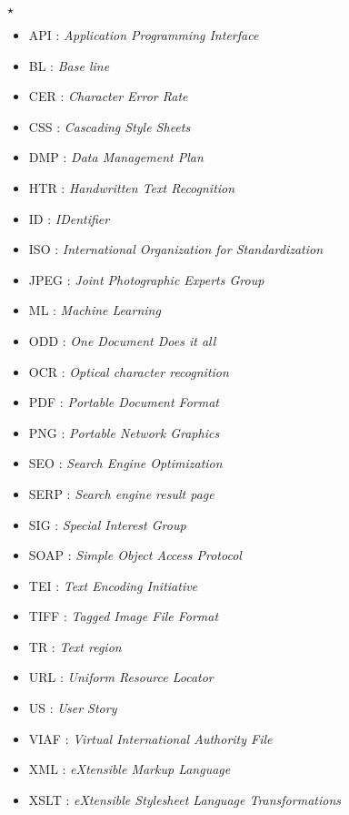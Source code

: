\begin{center}
$\star$
\end{center} 


\begin{itemize}
\item API : \emph{Application Programming Interface}
\item BL : \emph{Base line}
\item CER : \emph{Character Error Rate}
\item CSS : \emph{Cascading Style Sheets}
\item DMP : \emph{Data Management Plan}
\item HTR : \emph{Handwritten Text Recognition }
\item ID : \emph{IDentifier}
\item ISO : \emph{International Organization for Standardization}
\item JPEG : \emph{Joint Photographic Experts Group}
\item ML : \emph{Machine Learning}
\item ODD : \emph{One Document Does it all}
\item OCR : \emph{Optical character recognition}
\item PDF : \emph{Portable Document Format}
\item PNG : \emph{Portable Network Graphics}
\item SEO : \emph{Search Engine Optimization}
\item SERP : \emph{Search engine result page}
\item SIG : \emph{Special Interest Group}
\item SOAP : \emph{Simple Object Access Protocol}
\item TEI : \emph{Text Encoding Initiative} 
\item TIFF : \emph{Tagged Image File Format}
\item TR : \emph{Text region}
\item URL : \emph{Uniform Resource Locator}
\item US : \emph{User Story}
\item VIAF : \emph{Virtual International Authority File}
\item XML : \emph{eXtensible Markup Language}
\item XSLT : \emph{eXtensible Stylesheet Language Transformations}
\end{itemize}
